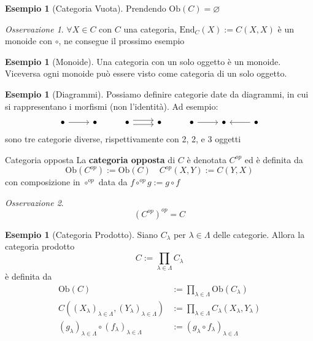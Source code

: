 \documentclass[notitlepage]{report}
\newcounter{theo}[section]\setcounter{theo}{0}
\newcounter{excounter}[section]\setcounter{excounter}{0}
\numberwithin{equation}{section}
\theoremstyle{plain}
\theoremstyle{definition}
\newtheorem{example}[excounter]{Esempio}
\theoremstyle{remark}
\newtheorem*{remark}{Osservazione}
\begin{document}
\begin{example}[Categoria Vuota]
    Prendendo \(\mathrm{Ob}{(C)} = \varnothing\)
\end{example}
\begin{remark}{}
    \(\forall X \in C\) con \(C\) una categoria, \(\mathrm{End}_C{(X)} := C{(X, X)}\) è un monoide con \(\circ\), ne consegue il prossimo esempio
\end{remark}
\begin{example}[Monoide]
    Una categoria con un solo oggetto è un monoide. Viceversa ogni monoide può
    essere visto come categoria di un solo oggetto.
\end{example}

\begin{example}[Diagrammi]
    Possiamo definire categorie date da diagrammi, in cui si rappresentano i
    morfismi (non l'identità). Ad esempio:
\[\begin{tikzcd}
	\bullet & \bullet & \bullet & \bullet & \bullet & \bullet & \bullet
	\arrow[from=1-1, to=1-2]
	\arrow[shift left, from=1-3, to=1-4]
	\arrow[shift right, from=1-3, to=1-4]
	\arrow[from=1-5, to=1-6]
	\arrow[from=1-7, to=1-6]
\end{tikzcd}\]
    sono tre categorie diverse, rispettivamente con 2, 2, e 3 oggetti
\end{example}

\begin{definition}{Categoria opposta}
    La \textbf{categoria opposta} di \(C\) è denotata \(C^{op}\) ed è definita
    da
    \[
        \mathrm{Ob}{(C^{op})} := \mathrm{Ob}{(C)} \quad C^{op}{(X, Y)} := C{(Y, X)}
    \]
    con composizione in \(\circ^{op}\) data da \(f \circ^{op} g := g \circ f\) 
\end{definition}
\begin{remark}{}
    \[
      {(C^{op})}^{op} = C
    \]
\end{remark}
\begin{example}[Categoria Prodotto]
    Siano \(C_{\lambda} \) per \(\lambda \in \Lambda\) delle categorie. Allora
    la categoria prodotto
    \[
      C := \prod_{\lambda \in \Lambda} C_{\lambda} 
    \]
    è definita da 
    \begin{align*}
      \mathrm{Ob}{(C)} &:= \prod_{\lambda \in \Lambda} \mathrm{Ob}{(C_\lambda)} \\
      C{({(X_{\lambda} )}_{\lambda \in \Lambda}, {(Y_{\lambda} )}_{\lambda \in \Lambda} )} &:= \prod_{\lambda \in \Lambda} C_{\lambda} {(X_{\lambda} , Y_\lambda)} \\
      {(g_{\lambda} )}_{\lambda \in \Lambda} \circ {(f_{\lambda} )}_{\lambda \in \Lambda} &:= {(g_{\lambda} \circ f_{\lambda} )}_{\lambda \in \Lambda} 
    \end{align*}
\end{example}
\end{document}
